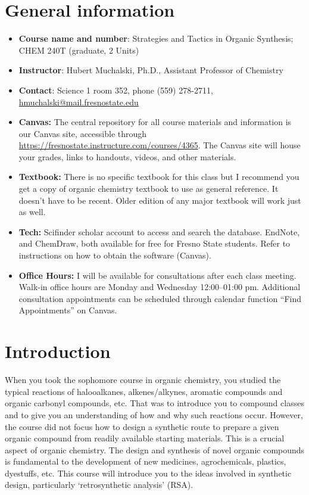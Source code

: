 \hypertarget{general-information}{%
\section{General information}\label{general-information}}

\begin{itemize}
\tightlist
\item
  \textbf{Course name and number}: Strategies and Tactics in Organic
  Synthesis; CHEM 240T (graduate, 2 Units)
\item
  \textbf{Instructor}: Hubert Muchalski, Ph.D., Assistant Professor of
  Chemistry
\item
  \textbf{Contact}: Science 1 room 352, phone (559) 278-2711,
  \url{hmuchalski@mail.fresnostate.edu}
\item
  \textbf{Canvas:} The central repository for all course materials and
  information is our Canvas site, accessible through
  \url{https://fresnostate.instructure.com/courses/4365}. The Canvas
  site will house your grades, links to handouts, videos, and other
  materials.
\item
  \textbf{Textbook:} There is no specific textbook for this class but I
  recommend you get a copy of organic chemistry textbook to use as
  general reference. It doesn't have to be recent. Older edition of any
  major textbook will work just as well.
\item
  \textbf{Tech:} Scifinder scholar account to access and search the
  database. EndNote, and ChemDraw, both available for free for Fresno
  State students. Refer to instructions on how to obtain the software
  (Canvas).
\item
  \textbf{Office Hours:} I will be available for consultations after
  each class meeting. Walk-in office hours are Monday and Wednesday
  12:00--01:00 pm. Additional consultation appointments can be scheduled
  through calendar function ``Find Appointments'' on Canvas.
\end{itemize}

\hypertarget{introduction}{%
\section{Introduction}\label{introduction}}

When you took the sophomore course in organic chemistry, you studied the
typical reactions of halooalkanes, alkenes/alkynes, aromatic compounds
and organic carbonyl compounds, etc. That was to introduce you to
compound classes and to give you an understanding of how and why such
reactions occur. However, the course did not focus how to design a
synthetic route to prepare a given organic compound from readily
available starting materials. This is a crucial aspect of organic
chemistry. The design and synthesis of novel organic compounds is
fundamental to the development of new medicines, agrochemicals,
plastics, dyestuffs, etc. This course will introduce you to the ideas
involved in synthetic design, particularly `retrosynthetic analysis'
(RSA).

